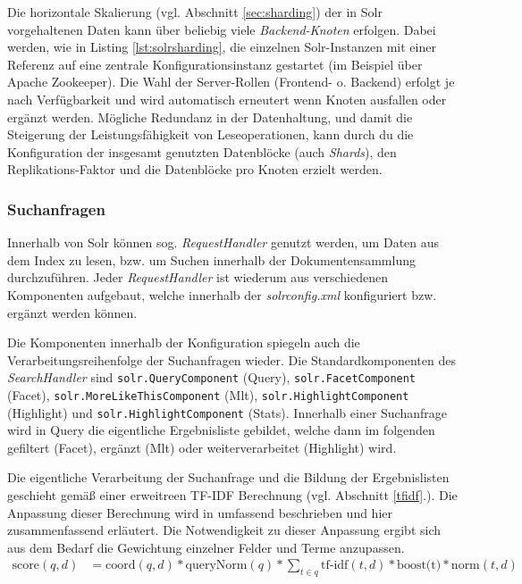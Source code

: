

Die horizontale Skalierung (vgl. Abschnitt \ref{sec:sharding}) der in Solr vorgehaltenen Daten kann über beliebig viele \textit{Backend-Knoten} erfolgen. Dabei werden, wie in Listing \ref{lst:solrsharding}, die einzelnen Solr-Instanzen mit einer Referenz auf eine zentrale Konfigurationsinstanz gestartet (im Beispiel über Apache Zookeeper). Die Wahl der Server-Rollen (Frontend- o. Backend) erfolgt je nach Verfügbarkeit und wird automatisch erneutert wenn Knoten ausfallen oder ergänzt werden. Mögliche Redundanz in der Datenhaltung, und damit die Steigerung der Leistungsfähigkeit von Leseoperationen, kann durch du die Konfiguration der insgesamt genutzten Datenblöcke (auch \textit{Shards}), den Replikations-Faktor und die Datenblöcke pro Knoten erzielt werden.

\subsubsection{Suchanfragen}

Innerhalb von Solr können sog. \textit{RequestHandler} genutzt werden, um Daten aus dem Index zu lesen, bzw. um Suchen innerhalb der Dokumentensammlung durchzuführen. Jeder \textit{RequestHandler} ist wiederum aus verschiedenen Komponenten aufgebaut, welche innerhalb der \textit{solrconfig.xml} konfiguriert bzw. ergänzt werden können.

Die Komponenten innerhalb der Konfiguration spiegeln auch die Verarbeitungsreihenfolge der Suchanfragen wieder. Die Standardkomponenten des \textit{SearchHandler} sind \texttt{solr.QueryComponent} (Query), \texttt{solr.FacetComponent} (Facet), \texttt{solr.MoreLikeThisComponent} (Mlt), \texttt{solr.HighlightComponent} (Highlight) und \texttt{solr.HighlightComponent} (Stats). Innerhalb einer Suchanfrage wird in Query die eigentliche Ergebnisliste gebildet, welche dann im folgenden gefiltert (Facet), ergänzt (Mlt) oder weiterverarbeitet (Highlight) wird.

Die eigentliche Verarbeitung der Suchanfrage und die Bildung der Ergebnislisten geschieht gemäß einer erweitreen \acs{TF-IDF} Berechnung (vgl. Abschnitt \ref{tfidf}.). Die Anpassung dieser Berechnung wird in \citep{TFIDFSimilarity} umfassend beschrieben und hier zusammenfassend erläutert. Die Notwendigkeit zu dieser Anpassung ergibt sich aus dem Bedarf die Gewichtung einzelner Felder und Terme anzupassen.
\begin{align}
\text{score}(q, d) & = \text{coord}(q,d) \ast \text{queryNorm}(q) \ast \sum_{t \in q}{\text{tf-idf}(t, d) \ast \text{boost(t)} \ast \text{norm}(t,d)} \label{lucenedocscore}
\end{align}

